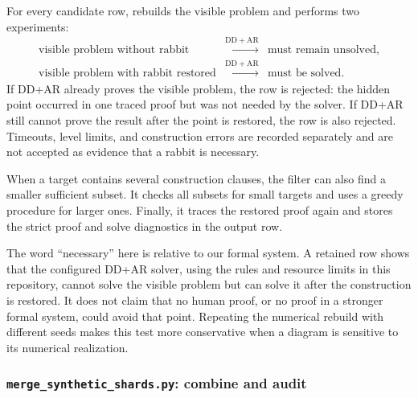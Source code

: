 \documentclass[reqno]{amsart}
\DeclareMathOperator{\1}{\textbf{1}}
\begin{document}
For every candidate row,  rebuilds the visible
problem and performs two experiments:
\[
\begin{array}{rcl}
\text{visible problem without rabbit} & \xrightarrow{\mathrm{DD+AR}} &
\text{must remain unsolved},\\
\text{visible problem with rabbit restored} & \xrightarrow{\mathrm{DD+AR}} &
\text{must be solved}.
\end{array}
\]
If DD+AR already proves the visible problem, the row is rejected: the hidden
point occurred in one traced proof but was not needed by the solver.  If DD+AR
still cannot prove the result after the point is restored, the row is also
rejected.  Timeouts, level limits, and construction errors are recorded
separately and are not accepted as evidence that a rabbit is necessary.

When a target contains several construction clauses, the filter can also find
a smaller sufficient subset.  It checks all subsets for small targets and
uses a greedy procedure for larger ones.  Finally, it traces the restored proof
again and stores the strict proof and solve diagnostics in the output row.

The word ``necessary'' here is relative to our formal system.  A retained row
shows that the configured DD+AR solver, using the rules and resource limits in
this repository, cannot solve the visible problem but can solve it after the
construction is restored.  It does not claim that no human proof, or no proof
in a stronger formal system, could avoid that point.  Repeating the numerical
rebuild with different seeds makes this test more conservative when a diagram
is sensitive to its numerical realization.

\subsubsection{\texttt{merge\_synthetic\_shards.py}: combine and audit}
\end{document}
